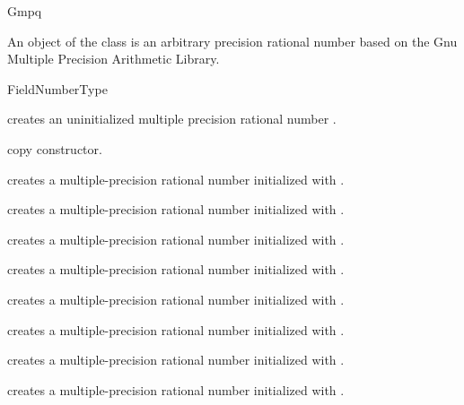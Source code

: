 \ccDefGlobalScope{}
\begin{ccRefClass} {Gmpq}
\label{Gmpq}

\ccDefinition

An object of the class  is an arbitrary precision rational
number based on the {\sc Gnu} Multiple Precision Arithmetic Library. 


\ccIsModel
FieldNumberType

\ccTypes


\ccCreation
{}

             {creates an uninitialized multiple precision rational number \ccVar.}

\ccHidden {}
            {copy constructor.}

            {creates a multiple-precision rational number initialized with
             .}

            {creates a multiple-precision rational number initialized with
             .}

            {creates a multiple-precision rational number initialized with
             .}

            {creates a multiple-precision rational number initialized with
             .}

            {creates a multiple-precision rational number initialized with
             .}

            {creates a multiple-precision rational number initialized with
             .}

            {creates a multiple-precision rational number initialized with
             .}

            {creates a multiple-precision rational number initialized with
             .}



\end{ccRefClass}
